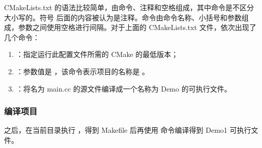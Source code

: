 \documentclass[a4paper,12pt,english]{sphinxmanual}
\begin{document}
\sphinxAtStartPar
CMakeLists.txt 的语法比较简单，由命令、注释和空格组成，其中命令是不区分大小写的。符号 \sphinxcode{\sphinxupquote{\#}} 后面的内容被认为是注释。命令由命令名称、小括号和参数组成，参数之间使用空格进行间隔。对于上面的 CMakeLists.txt 文件，依次出现了几个命令：
\begin{enumerate}
%
\item {} 
\sphinxAtStartPar
{}：指定运行此配置文件所需的 CMake 的最低版本；

\item {} 
\sphinxAtStartPar
{}：参数值是 ，该命令表示项目的名称是  。

\item {} 
\sphinxAtStartPar
{}：将名为 main.cc 的源文件编译成一个名称为 Demo 的可执行文件。

\end{enumerate}


\subsubsection{编译项目}
\label{\detokenize{dev-board/cmake:id2}}
\sphinxAtStartPar
之后，在当前目录执行  ，得到 Makefile 后再使用  命令编译得到 Demo1 可执行文件。
\end{document}
